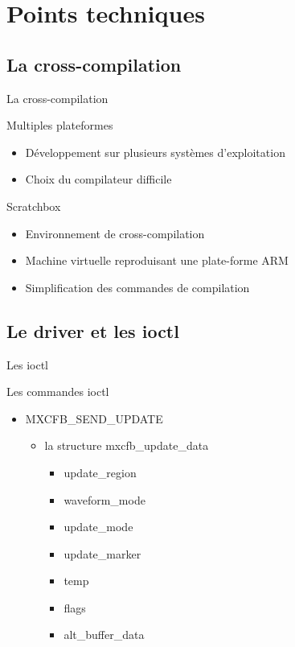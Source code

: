 \section{Points techniques}

\subsection{La cross-compilation}
\begin{frame}{La cross-compilation}
\begin{block}{Multiples plateformes}
\begin{itemize}
\item Développement sur plusieurs systèmes d'exploitation
\item Choix du compilateur difficile
\end{itemize}
\end{block}

\begin{block}{Scratchbox}
\begin{itemize}
\item Environnement de cross-compilation
\item Machine virtuelle reproduisant une plate-forme ARM 
\item Simplification des commandes de compilation
\end{itemize}
\end{block}
\end{frame}


\subsection{Le driver et les ioctl}
\begin{frame}[fragile]{Les ioctl}
	\begin{block}{Les commandes ioctl}
		\begin{itemize}
			\item MXCFB\_SEND\_UPDATE 
				\begin{itemize}
					\item la structure mxcfb\_update\_data 
							\begin{itemize}
								\item update\_region
								\item waveform\_mode
								\item update\_mode
								\item update\_marker
								\item temp
								\item flags
								\item alt\_buffer\_data
							\end{itemize}
				\end{itemize}
		\end{itemize}
	\end{block}
\end{frame}

